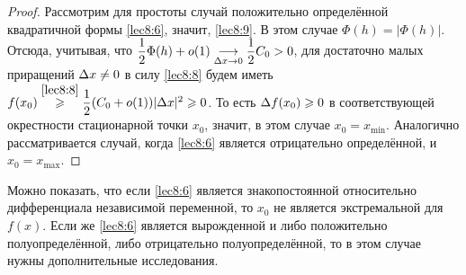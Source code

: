 \documentclass[../../main.tex]{subfiles}
\begin{document}
\begin{proof}
        Рассмотрим для простоты случай положительно определённой квадратичной
        формы \eqref{lec8:6}, значит, \eqref{lec8:9}. В этом случае $\Phi(h) =
        |\Phi(h)|$. Отсюда, учитывая, что $\dfrac12 \Phi(h) + o(1) \underset{\Delta
        x \to 0}{\longrightarrow} \dfrac12C_0 > 0$, для достаточно малых
        приращений $\Delta x \ne 0$ в силу \eqref{lec8:8} будем иметь $f(x_0)
        \stackrel{\eqref{lec8:8}}{\geqslant} \dfrac12 (C_0 + o(1)) |\Delta x|^2 \geqslant 0$.
        То есть $\Delta f(x_0) \geqslant 0$ в соответствующей окрестности стационарной
        точки $x_0$, значит, в этом случае $x_0 = x_{\min}$. Аналогично
        рассматривается случай, когда \eqref{lec8:6} является отрицательно
        определённой, и $x_0 = x_{\max}$.
    \end{proof}
    \begin{rem}
        Можно показать, что если \eqref{lec8:6} является знакопостоянной
        относительно дифференциала независимой переменной, то $x_0$ не
        является экстремальной для $f(x)$. Если же \eqref{lec8:6} является
        вырожденной и либо положительно полуопределённой, либо отрицательно
        полуопределённой, то в этом случае нужны дополнительные исследования.
    \end{rem}

~
\end{document}
